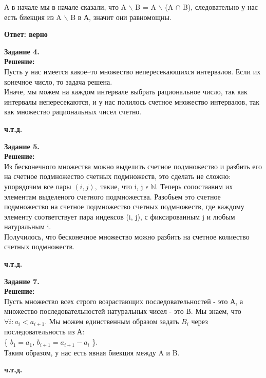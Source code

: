 \documentclass[12pt,a4paper]{scrartcl}
\begin{document}
	А в начале мы в начале сказали, что A $\backslash$ B = A $\backslash$ (A $\cap$ B), следовательно у нас есть биекция из A $\backslash$ B в А, значит они равномощны.
	\begin{flushright}
		\textbf{Ответ: верно}
	\end{flushright}
	\newpage
	\noindent
	\textbf{Задание 4.} 
	\\
	\textbf{Решение:} 
	\\ Пусть у нас имеется какое--то множество непересекающихся интервалов. Если их конечное число, то задача решена.\\
	Иначе, мы можем на каждом интервале выбрать рациональное число, так как интервалы непересекаются, и у нас полилось счетное множество интервалов, так как множество рациональных чисел счетно.
	\begin{flushright}
	\textbf{ч.т.д.}
	\end{flushright}
	\textbf{Задание 5.} 
	\\
	\textbf{Решение:} 
	\\ Из бесконечного множества можно выделить счетное подмножество и разбить его на счетное подмножество счетных подмножеств, это сделать не сложно:
	\\ упорядочим все пары $(i, j),$ такие, что i, j $\epsilon$ $ \mathbb{N}$. Теперь сопостаавим их элементам выделеного счетного подмножества. Разобьем это счетное подмножество на счетное подмножество счетных подмножеств, где каждому элементу соответствует пара индексов (i, j), с фиксированным j и любым натуральным i.
	\\Получилось, что бесконечное множество можно разбить на счетное колиество счетных подмножеств.
	\begin{flushright}
		\textbf{ч.т.д.}
	\end{flushright}
	\textbf{Задание 7.} 
	\\
	\textbf{Решение:}
	\\ Пусть множество всех строго возрастающих последовательностей - это А, а множество последовательностей натуральных чисел - это В. Мы знаем, что $\forall i: a_i < a_{i + 1}$. Мы можем единственным образом задать $B_i$ через последовательность из А:\\
	\{ $b_1 = a_1$,  $b_{i + 1} = a_{i + 1} - a_i $ \}. \\
	Таким образом, у нас есть явная биекция между A и B. 
	\begin{flushright}
		\textbf{ч.т.д.}
	\end{flushright}
\end{document}
